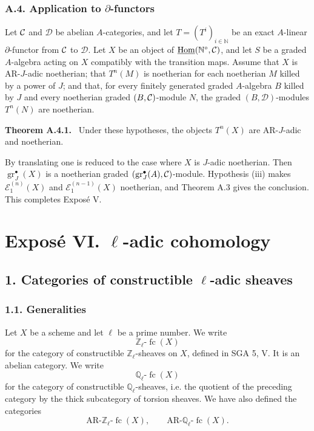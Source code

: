 \documentclass[11pt]{article}
\theoremstyle{plain}
\theoremstyle{definition}
\theoremstyle{remark}
\newenvironment{statement}[1]{\par\medskip\noindent\textbf{#1.}\ }{\par\medskip}
\newcommand{\bN}{\mathbb N}
\newcommand{\bQ}{\mathbb Q}
\newcommand{\bZ}{\mathbb Z}
\newcommand{\cD}{\mathcal D}\newcommand{\cE}{\mathcal E}\newcommand{\cF}{\mathcal F}
\DeclareMathOperator{\Hom}{Hom}
\DeclareMathOperator{\gr}{gr}
\newcommand{\AR}{\mathrm{AR}}
\providecommand{\fc}{\operatorname{fc}}
\begin{document}
\subsubsection*{A.4. Application to $\partial$-functors}

Let $\mathcal C$ and $\cD$ be abelian $A$-categories, and let
$T=(T^i)_{i\in\bN}$ be an exact $A$-linear $\partial$-functor from $\mathcal C$ to $\cD$.
Let $X$ be an object of $\underline{\Hom}(\bN^\circ,\cC)$, and let $S$ be a graded
$A$-algebra acting on $X$ compatibly with the transition maps. Assume that $X$ is
AR-$J$-adic noetherian; that $T^n(M)$ is noetherian for each noetherian $M$ killed
by a power of $J$; and that, for every finitely generated graded $A$-algebra $B$
killed by $J$ and every noetherian graded $(B,\mathcal C)$-module $N$, the graded
$(B,\cD)$-modules $T^n(N)$ are noetherian.

\begin{statement}{Theorem A.4.1}
Under these hypotheses, the objects $T^n(X)$ are AR-$J$-adic and noetherian.
\end{statement}

By translating one is reduced to the case where $X$ is $J$-adic noetherian. Then
$\gr_J^\bullet(X)$ is a noetherian graded
$(\gr_J^\bullet(A),\cC)$-module. Hypothesis (iii) makes
$\cE_1^{(n)}(X)$ and $\cE_1^{(n-1)}(X)$ noetherian, and Theorem A.3 gives the
conclusion. This completes Exposé V.

\newpage

\section*{Exposé VI. $\ell$-adic cohomology}

\subsection*{1. Categories of constructible $\ell$-adic sheaves}

\subsubsection*{1.1. Generalities}

Let $X$ be a scheme and let $\ell$ be a prime number. We write
\[
       \bZ_\ell\text{-}\fc(X)
\]
for the category of constructible $\bZ_\ell$-sheaves on $X$, defined in SGA 5, V.
It is an abelian category. We write
\[
       \bQ_\ell\text{-}\fc(X)
\]
for the category of constructible $\bQ_\ell$-sheaves, i.e. the quotient of the
preceding category by the thick subcategory of torsion sheaves. We have also defined
the categories
\[
       \AR\text{-}\bZ_\ell\text{-}\fc(X),
       \qquad
       \AR\text{-}\bQ_\ell\text{-}\fc(X).
\]
\end{document}
